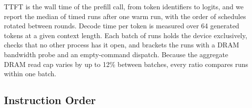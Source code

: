 TTFT is the wall time of the prefill call, from token identifiers to logits, and we report the median of  timed runs after one warm run, with the order of schedules rotated between rounds.
Decode time per token is measured over 64 generated tokens at a given context length.
Each batch of runs holds the device exclusively, checks that no other process has it open, and brackets the runs with a DRAM bandwidth probe and an empty-command dispatch.
Because the aggregate DRAM read cap varies by up to 12\% between batches, every ratio compares runs within one batch.

\subsection{Instruction Order}
\label{subsec:ttft}

